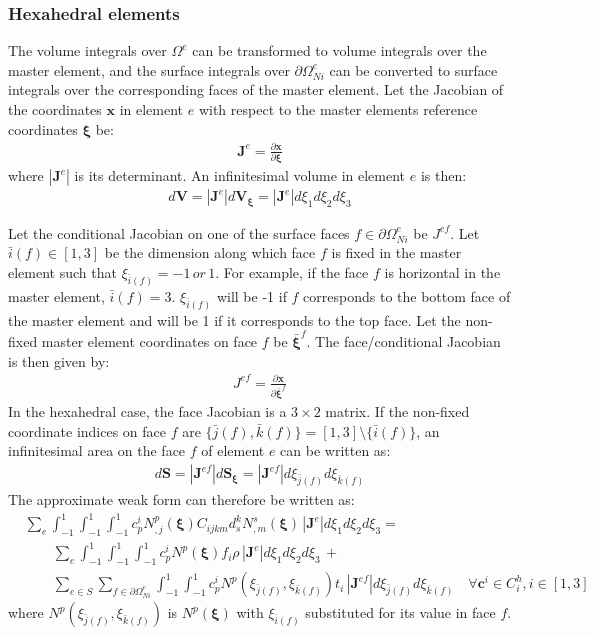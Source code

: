 	\subsubsection{Hexahedral elements}

	The volume integrals over $\Omega^e$ can be transformed to volume integrals over the master element, and the surface integrals over $\partial \Omega^e_{Ni}$ can be converted to surface integrals over the corresponding faces of the master element. Let the Jacobian of the coordinates $\bm{x}$ in element $e$ with respect to the master elements reference coordinates $\bm{\xi}$ be:
	\begin{align}
	    \bm{J}^e = \frac{\partial \bm{x}}{\partial \bm{\xi}}
	\end{align}
	where $|\bm{J}^e|$ is its determinant. An infinitesimal volume in element $e$ is then:
	\begin{align}
	    d\bm{V} = |\bm{J}^e|d\bm{V_\xi} = |\bm{J}^e|d\xi_1 d\xi_2 d\xi_3
	\end{align}
	
	Let the conditional Jacobian on one of the surface faces $f \in \partial \Omega^e_{Ni}$ be $J^{ef}$. Let $\bar{i}(f) \in [1,3]$ be the dimension along which face $f$ is fixed in the master element such that $\xi_{\bar{i}(f)} = -1 \, or \, 1$. For example, if the face $f$ is horizontal in the master element, $\bar{i}(f) = 3$. $\xi_{\bar{i}(f)}$ will be -1 if $f$ corresponds to the bottom face of the master element and will be 1 if it corresponds to the top face. Let the non-fixed master element coordinates on face $f$ be $\bar{\bm{\xi}}^f$. The face/conditional Jacobian is then given by:
	\begin{align}
	    J^{ef} = \frac{\partial \bm{x}}{\partial \bar{\bm{\xi}}^f}
	\end{align}
	In the hexahedral case, the face Jacobian is a $3 \times 2$ matrix. If the non-fixed coordinate indices on face $f$ are $\{\bar{j}(f), \bar{k}(f)\} = [1,3] \setminus \{\bar{i}(f)\}$, an infinitesimal area on the face $f$ of element $e$ can be written as:
    \begin{align}
        d\bm{S} = |\bm{J}^{ef}| d\bm{S_{\xi}} = |\bm{J}^{ef}| d\xi_{\bar{j}(f)}d\xi_{\bar{k}(f)}
    \end{align}
    The approximate weak form can therefore be written as:
	\begin{align}
		& \sum_e \int_{-1}^1 \int_{-1}^1 \int_{-1}^1 c^i_pN^p_{,j}(\bm{\xi})C_{ijkm}d^k_sN^s_{,m}(\bm{\xi}) \,|\bm{J}^e|d\xi_1 d\xi_2 d\xi_3= \nonumber \\
		& \qquad \sum_e \int_{-1}^1 \int_{-1}^1 \int_{-1}^1 c^i_pN^p(\bm{\xi})f_i \rho\,|\bm{J}^e|d\xi_1 d\xi_2 d\xi_3 \, + \nonumber \\
		& \qquad \sum_{e \in S} \sum_{f \in \partial \Omega^e_{Ni}}\int_{-1}^1 \int_{-1}^1 c^i_pN^p(\xi_{\bar{j}(f)}, \xi_{\bar{k}(f)})t_i \,|\bm{J}^{ef}| d\xi_{\bar{j}(f)} d\xi_{\bar{k}(f)}\quad \forall \bm{c}^i \in C^h_i, i \in [1,3]
	\end{align}
	where $N^p(\xi_{\bar{j}(f)}, \xi_{\bar{k}(f)})$ is $N^p(\bm{\xi})$ with $\xi_{\bar{i}(f)}$ substituted for its value in face $f$.


